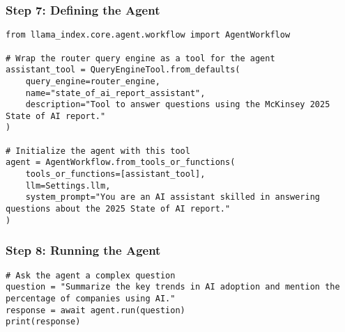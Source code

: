 \begin{frame}[fragile]\frametitle{Step 7: Defining the Agent}


		\begin{lstlisting}
from llama_index.core.agent.workflow import AgentWorkflow

# Wrap the router query engine as a tool for the agent
assistant_tool = QueryEngineTool.from_defaults(
    query_engine=router_engine,
    name="state_of_ai_report_assistant",
    description="Tool to answer questions using the McKinsey 2025 State of AI report."
)

# Initialize the agent with this tool
agent = AgentWorkflow.from_tools_or_functions(
    tools_or_functions=[assistant_tool],
    llm=Settings.llm,
    system_prompt="You are an AI assistant skilled in answering questions about the 2025 State of AI report."
)
		\end{lstlisting}	

\end{frame}

\begin{frame}[fragile]\frametitle{Step 8: Running the Agent}


		\begin{lstlisting}
# Ask the agent a complex question
question = "Summarize the key trends in AI adoption and mention the percentage of companies using AI."
response = await agent.run(question)
print(response)
		\end{lstlisting}	

\end{frame}
